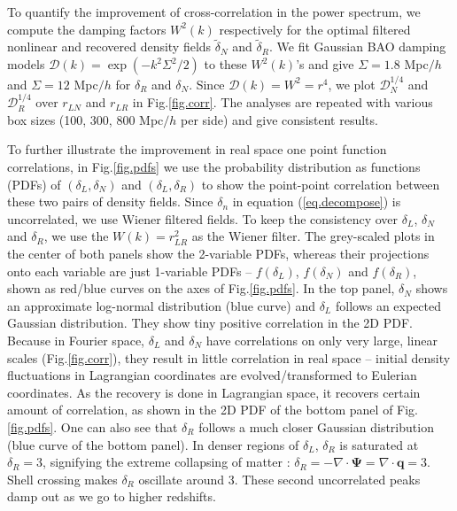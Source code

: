\documentclass[aps,prd,twocolumn,superscriptaddress,amsfont,amssymb,amsmath,nofootinbib,showpacs,balancelastpage]{revtex4-1}
\newcommand{\bs}{\boldsymbol}
\begin{document}
To quantify the improvement of cross-correlation in the power
spectrum, we compute the 
damping factors $W^2(k)$ respectively for the optimal filtered 
nonlinear and recovered density fields $\tilde\delta_N$
and $\tilde\delta_R$.
We fit Gaussian BAO damping models
${\mathcal D}(k)=\exp(-k^2\Sigma^2/2)$ to these $W^2(k)$'s
and give $\Sigma=1.8$ Mpc$/h$ and $\Sigma=12$ 
Mpc$/h$ for $\delta_R$ and $\delta_N$.
Since ${\mathcal D}(k)=W^2=r^4$, we plot
${\mathcal D}_N^{1/4}$ and ${\mathcal D}_R^{1/4}$
over $r_{LN}$ and $r_{LR}$ in Fig.\ref{fig.corr}.
The analyses are repeated with various box sizes (100, 300, 800 Mpc$/h$ per side)
and give consistent results.

To further illustrate the improvement in real space
one point function correlations,
in Fig.\ref{fig.pdfs} we use the probability distribution
as functions (PDFs) of $(\delta_L,\delta_N)$ and $(\delta_L,\delta_R)$
to show the point-point correlation between these two pairs of density
fields. Since $\delta_n$ in equation (\ref{eq.decompose}) is
uncorrelated, we use Wiener filtered fields. To keep the
consistency over $\delta_L$, $\delta_N$ and $\delta_R$, we
use the $W(k)=r^2_{LR}$ as the Wiener filter.
The grey-scaled plots in the center of both panels show the 2-variable PDFs,
whereas their projections onto each variable are just
1-variable PDFs -- $f(\delta_L)$, $f(\delta_N)$ and $f(\delta_R)$, shown
as red/blue curves on the axes of Fig.\ref{fig.pdfs}.
In the top panel, $\delta_N$ shows an approximate log-normal
distribution (blue curve) and $\delta_L$ follows an expected
Gaussian distribution. They show tiny positive correlation in the
2D PDF.
Because in Fourier space, $\delta_L$ and $\delta_N$ have
correlations on only very large, linear scales (Fig.\ref{fig.corr}),
they result in little correlation in real space -- initial density fluctuations
in Lagrangian coordinates are evolved/transformed to Eulerian coordinates.
As the recovery is done in Lagrangian space, it recovers
certain amount of correlation, as shown in the 2D PDF of the bottom panel
of Fig.\ref{fig.pdfs}. One can also see that $\delta_R$ follows
a much closer Gaussian distribution (blue curve of the bottom panel).
In denser regions of $\delta_L$, $\delta_R$ is saturated at
$\delta_R=3$, signifying the extreme collapsing of matter \citep{2013MNRAS.428..141N}:
$\delta_R=-\nabla\cdot\bs\Psi=\nabla\cdot\bs q=3$. Shell crossing
makes $\delta_R$ oscillate around 3. These second uncorrelated peaks
damp out as we go to higher redshifts.
\end{document}
